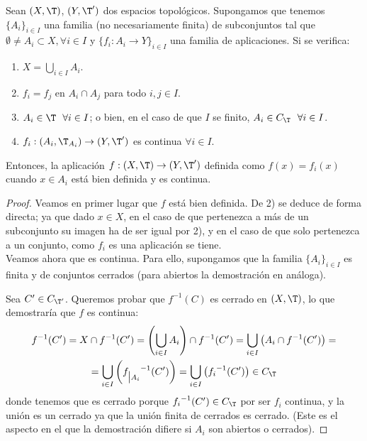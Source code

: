 \begin{lema}[de pegado] Sean $(X,\T)$, $(Y,\T')$ dos espacios topológicos. Supongamos que tenemos $\{A_i\}_{i\in I}$ una familia (no necesariamente finita) de subconjuntos tal que $\emptyset\neq A_i\subset X,\forall i\in I$ y $\{f_i:A_i\to Y\}_{i\in I}$ una familia de aplicaciones. Si se verifica:
\begin{enumerate}
    \item $X=\bigcup\limits_{i\in I}A_i$.
    \item $f_i=f_j$ en $A_i\cap A_j$ para todo $i,j\in I$.
    \item $A_i\in \T~~\forall i\in I$; o bien, en el caso de que $I$ se finito, $A_i\in C_\T ~~\forall i\in I$.
    \item $f_i:(A_i,\T_{A_i})\to (Y,\T')$ es continua $\forall i\in I$.
\end{enumerate}

Entonces, la aplicación $f:(X,\T)\to (Y,\T')$ definida como $f(x)=f_i(x)$ cuando $x\in A_i$ está bien definida y es continua.
\end{lema}
\begin{proof}

    Veamos en primer lugar que $f$ está bien definida. De 2) se deduce de forma directa; ya que dado $x\in X$, en el caso de que pertenezca a más de un subconjunto su imagen ha de ser igual por 2), y en el caso de que solo pertenezca a un conjunto, como $f_i$ es una aplicación se tiene.\\

    Veamos ahora que es continua. Para ello, supongamos que la familia $\{A_i\}_{i\in I}$ es finita y de conjuntos cerrados (para abiertos la demostración en análoga).

    Sea $C'\in C_{\T'}$. Queremos probar que $f^{-1}(C)$ es cerrado en $(X,\T)$, lo que demostraría que $f$ es continua:
    \begin{multline*}
        f^{-1}(C')=X\cap f^{-1}(C') = \left(\bigcup_{i\in I}A_i\right)\cap f^{-1}(C') = \bigcup_{i\in I}\left(A_i\cap f^{-1}(C')\right)
        =\\= \bigcup_{i\in I}\left({f_{\big| A_i}}^{-1}(C')\right)
        = \bigcup_{i\in I}\left({f_i}^{-1}(C')\right) \in C_\T
    \end{multline*}
    donde tenemos que es cerrado porque ${f_i}^{-1}(C')\in C_\T$ por ser $f_i$ continua, y la unión es un cerrado ya que la unión finita de cerrados es cerrado. (Este es el aspecto en el que la demostración difiere si $A_i$ son abiertos o cerrados).
\end{proof}


